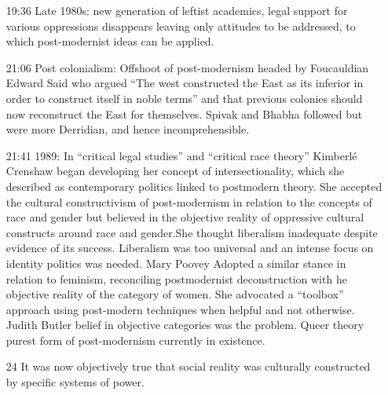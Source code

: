 \documentclass[10pt,titlepage]{book}
\begin{document}
\begin{itemize}
   \item[19:36] Late 1980s: new generation of leftist academics, legal support for various oppressions disappears leaving only attitudes to be addressed, to which post-modernist ideas can be applied.
   \item[21:06] Post colonialism: Offshoot of post-modernism headed by Foucauldian Edward Said who argued ``The west constructed the East as its inferior in order to construct itself in noble terms'' and that previous colonies should now reconstruct the East for themselves.
     Spivak and Bhabha followed but were more Derridian, and hence incomprehensible.
   \item[21:41] 1989: In ``critical legal studies'' and ``critical race theory'' Kimberlé Crenshaw began developing her concept of intersectionality, which she described as contemporary politics linked to postmodern theory.
     She accepted the cultural constructivism of post-modernism in relation to the concepts of race and gender but believed in the objective reality of oppressive cultural constructs around race and gender.She thought liberalism inadequate despite evidence of its success.
     Liberalism was too universal and an intense focus on identity politics was needed.
     Mary Poovey Adopted a similar stance in relation to feminism, reconciling postmodernist deconstruction with he objective reality of the category of women.
     She advocated a ``toolbox'' approach using post-modern techniques when helpful and not otherwise.
     Judith Butler belief in  objective categories was the problem.
     Queer theory purest form of post-modernism currently in existence.
     
     \item[24] It was now objectively true that social reality was culturally constructed by specific systems of power.


\end{itemize}
\end{document}
